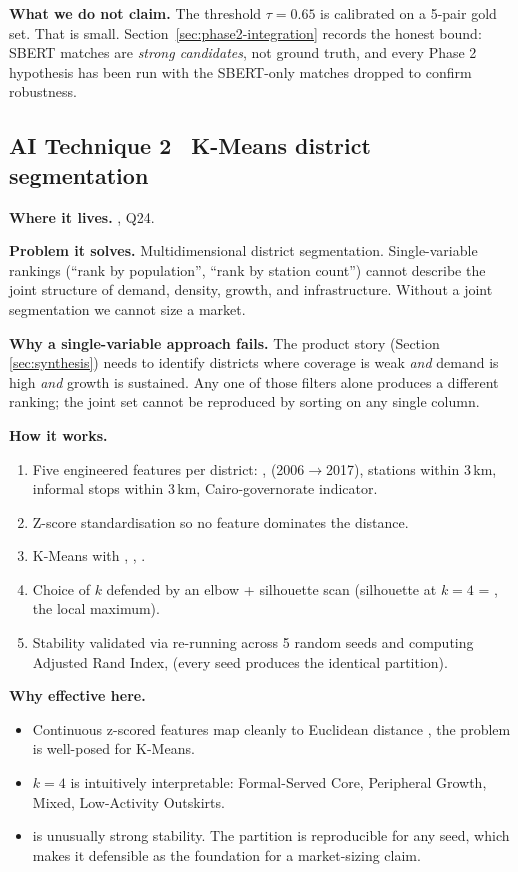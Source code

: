 \textbf{What we do not claim.} The threshold $\tau = 0.65$ is calibrated on a 5-pair gold set. That is small. Section~\ref{sec:phase2-integration}
records the honest bound: SBERT matches are \emph{strong candidates},
not ground truth, and every Phase 2 hypothesis has been run with the
SBERT-only matches dropped to confirm robustness.

\subsection{AI Technique 2 \textbullet\ K-Means district segmentation}

\textbf{Where it lives.} , Q24.

\textbf{Problem it solves.} Multidimensional district segmentation.
Single-variable rankings (``rank by population'', ``rank by station
count'') cannot describe the joint structure of demand, density,
growth, and infrastructure. Without a joint segmentation we cannot
size a market.

\textbf{Why a single-variable approach fails.} The product story (Section
\ref{sec:synthesis}) needs to identify districts where coverage is
weak \emph{and} demand is high \emph{and} growth is sustained. Any one
of those filters alone produces a different ranking; the joint set
cannot be reproduced by sorting on any single column.

\textbf{How it works.}
\begin{enumerate}
 \item Five engineered features per district:
 ,  (2006$\to$2017),
 stations within 3\,km, informal stops within 3\,km,
 Cairo-governorate indicator.
 \item Z-score standardisation so no feature dominates the distance.
 \item K-Means with , , .
 \item Choice of $k$ defended by an elbow + silhouette scan
 (silhouette at $k=4$ = , the local maximum).
 \item Stability validated via re-running across 5 random seeds and
 computing Adjusted Rand Index,  (every seed
 produces the identical partition).
\end{enumerate}

\textbf{Why effective here.}
\begin{itemize}
 \item Continuous z-scored features map cleanly to Euclidean distance
, the problem is well-posed for K-Means.
 \item $k=4$ is intuitively interpretable: Formal-Served Core,
 Peripheral Growth, Mixed, Low-Activity Outskirts.
 \item {} is unusually strong stability. The partition is reproducible for any seed, which makes it
 defensible as the foundation for a market-sizing claim.
\end{itemize}

